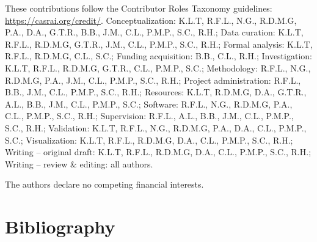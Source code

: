 \begin{contributions}
 These contributions follow the Contributor Roles Taxonomy guidelines: \href{https://casrai.org/credit/}{https://casrai.org/credit/}.
 Conceptualization: K.L.T, R.F.L., N.G., R.D.M.G, P.A., D.A., G.T.R., B.B., J.M., C.L., P.M.P., S.C., R.H.;
 Data curation: K.L.T, R.F.L., R.D.M.G, G.T.R., J.M., C.L., P.M.P., S.C., R.H.;
 Formal analysis:  K.L.T, R.F.L., R.D.M.G, C.L., S.C.;
 Funding acquisition:  B.B., C.L., R.H.;
 Investigation: K.L.T, R.F.L., R.D.M.G, G.T.R., C.L., P.M.P., S.C.;
 Methodology: R.F.L., N.G., R.D.M.G, P.A., J.M., C.L., P.M.P., S.C., R.H.;
 Project administration: R.F.L., B.B., J.M., C.L., P.M.P., S.C., R.H.;
 Resources: K.L.T, R.D.M.G, D.A., G.T.R., A.L., B.B., J.M., C.L., P.M.P., S.C.;
 Software: R.F.L., N.G., R.D.M.G, P.A., C.L., P.M.P., S.C., R.H.;
 Supervision: R.F.L., A.L., B.B., J.M., C.L., P.M.P., S.C., R.H.;
 Validation: K.L.T, R.F.L., N.G., R.D.M.G, P.A., D.A., C.L., P.M.P., S.C.;
 Visualization:  K.L.T, R.F.L., R.D.M.G, D.A., C.L., P.M.P., S.C., R.H.;
 Writing – original draft: K.L.T, R.F.L., R.D.M.G, D.A., C.L., P.M.P., S.C., R.H.;
 Writing – review \& editing: all authors.

\end{contributions}

\begin{interests}
 The authors declare no competing financial interests.
\end{interests}

\section*{Bibliography}


